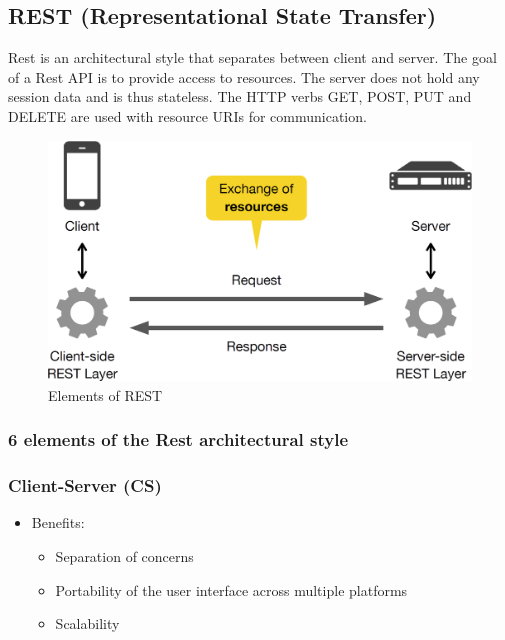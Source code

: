 \subsection{REST (Representational State Transfer)}
Rest is an architectural style that separates between client and server. The goal of a Rest API is to provide access to resources.
The server does not hold any session data and is thus stateless.
The HTTP verbs GET, POST, PUT and DELETE are used with resource URIs for communication.
\begin{figure}[H]
  \centering
  \includegraphics[width=.85\linewidth]{images/pattern_rest_layered_architecture.png}
  \caption{Elements of REST}
\end{figure}

\newpage

\subsubsection{6 elements of the Rest architectural style}
\subsubsection*{Client-Server (CS)}
\begin{itemize}[noitemsep, topsep=0pt]
	\item Benefits:
		\begin{itemize}[noitemsep, topsep=0pt]
			\item Separation of concerns
			\item Portability of the user interface across multiple platforms
			\item Scalability
		\end{itemize}
\end{itemize}

